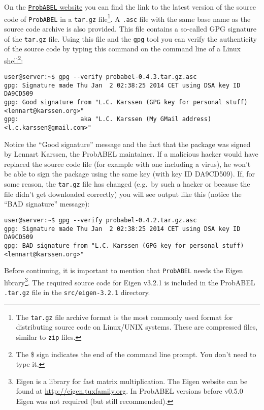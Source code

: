 \documentclass[12pt,a4paper]{article}
\newcommand{\PA}{\texttt{ProbABEL}}
\begin{document}
On the \href{http://www.genabel.org/packages/probabel}{\PA{} website}
you can find the link to the latest version of the source code of \PA{}
in a \texttt{tar.gz} file\footnote{The \texttt{tar.gz} file archive
  format is the most commonly used format for distributing source code
  on Linux/UNIX systems. These are compressed files, similar to
  \texttt{zip} files.}. A \texttt{.asc} file with the same base name
as the source code archive is also provided. This file contains a
so-called GPG signature of the \texttt{tar.gz} file. Using this file
and the \texttt{gpg} tool you can verify the authenticity of the
source code by typing this command on the command line of a Linux
shell\footnote{The \$ sign indicates the end of the command line
  prompt. You don't need to type it.}:
\begin{lstlisting}[basicstyle=\scriptsize\ttfamily]
user@server:~$ gpg --verify probabel-0.4.3.tar.gz.asc
gpg: Signature made Thu Jan  2 02:38:25 2014 CET using DSA key ID DA9CD509
gpg: Good signature from "L.C. Karssen (GPG key for personal stuff) <lennart@karssen.org>"
gpg:                 aka "L.C. Karssen (My GMail address) <l.c.karssen@gmail.com>"
\end{lstlisting}
Notice the ``Good signature'' message and the fact that the package was
signed by Lennart Karssen, the ProbABEL maintainer. If a malicious
hacker would have replaced the source code file (for example with one
including a virus), he won't be able to sign the package using the
same key (with key ID DA9CD509). If, for some reason, the
\texttt{tar.gz} file has changed (e.g.~by such a hacker or because
the file didn't get downloaded correctly) you will see output like
this (notice the ``BAD signature'' message):
\begin{lstlisting}[basicstyle=\scriptsize\ttfamily]
user@server:~$ gpg --verify probabel-0.4.2.tar.gz.asc
gpg: Signature made Thu Jan  2 02:38:25 2014 CET using DSA key ID DA9CD509
gpg: BAD signature from "L.C. Karssen (GPG key for personal stuff) <lennart@karssen.org>"
\end{lstlisting}

Before continuing, it is important to mention that \PA{} needs the
Eigen library\footnote{Eigen is a library for fast matrix
  multiplication. The Eigen website can be found at
  \url{http://eigen.tuxfamily.org}. In ProbABEL versions before v0.5.0
  Eigen was not required (but still recommended).}. The required
source code for Eigen v3.2.1 is included in the ProbABEL
\lstinline{.tar.gz} file in the \lstinline{src/eigen-3.2.1} directory.
\end{document}
